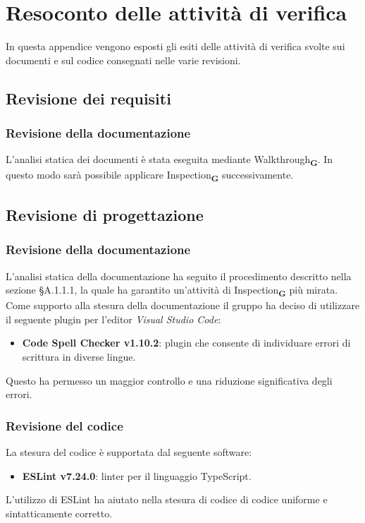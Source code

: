 \section{Resoconto delle attività di verifica}
In questa appendice vengono esposti gli esiti delle attività di verifica svolte sui documenti e sul codice consegnati nelle varie revisioni.
\subsection{Revisione dei requisiti}
\subsubsection{Revisione della documentazione}
L'analisi statica dei documenti è stata eseguita mediante Walkthrough\textsubscript{\textbf{G}}. In questo modo sarà possibile applicare Inspection\textsubscript{\textbf{G}} successivamente.
\subsection{Revisione di progettazione}
\subsubsection{Revisione della documentazione}
L'analisi statica della documentazione ha seguito il procedimento descritto nella sezione §A.1.1.1, la quale ha garantito un'attività di Inspection\textsubscript{\textbf{G}} più mirata.\\
Come supporto alla stesura della documentazione il gruppo ha deciso di utilizzare il seguente plugin per l'editor \textit{Visual Studio Code}:
\begin{itemize}
    \item \textbf{Code Spell Checker v1.10.2}: plugin che consente di individuare errori di scrittura in diverse lingue.
\end{itemize}
Questo ha permesso un maggior controllo e una riduzione significativa degli errori.
\subsubsection{Revisione del codice}
La stesura del codice è supportata dal seguente software:
\begin{itemize}
    \item \textbf{ESLint v7.24.0}: linter per il linguaggio TypeScript.
\end{itemize}
L'utilizzo di ESLint ha aiutato nella stesura di codice di codice uniforme e sintatticamente corretto.
